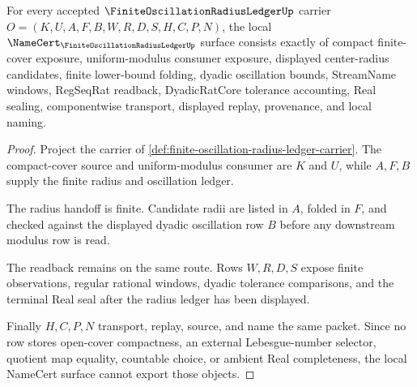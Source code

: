 \begin{theorem}
\label{thm:finite-oscillation-radius-ledger-namecert-obligations}
For every accepted $\FiniteOscillationRadiusLedgerUp$ carrier $O=(K,U,A,F,B,W,R,D,S,H,C,P,N)$, the local $\NameCert_{\FiniteOscillationRadiusLedgerUp}$ surface consists exactly of compact finite-cover exposure, uniform-modulus consumer exposure, displayed center-radius candidates, finite lower-bound folding, dyadic oscillation bounds, StreamName windows, RegSeqRat readback, DyadicRatCore tolerance accounting, Real sealing, componentwise transport, displayed replay, provenance, and local naming.
\end{theorem}
\begin{proof}
Project the carrier of \autoref{def:finite-oscillation-radius-ledger-carrier}. The compact-cover source and uniform-modulus consumer are $K$ and $U$, while $A,F,B$ supply the finite radius and oscillation ledger.

The radius handoff is finite. Candidate radii are listed in $A$, folded in $F$, and checked against the displayed dyadic oscillation row $B$ before any downstream modulus row is read.

The readback remains on the same route. Rows $W,R,D,S$ expose finite observations, regular rational windows, dyadic tolerance comparisons, and the terminal Real seal after the radius ledger has been displayed.

Finally $H,C,P,N$ transport, replay, source, and name the same packet. Since no row stores open-cover compactness, an external Lebesgue-number selector, quotient map equality, countable choice, or ambient Real completeness, the local NameCert surface cannot export those objects.
\end{proof}

